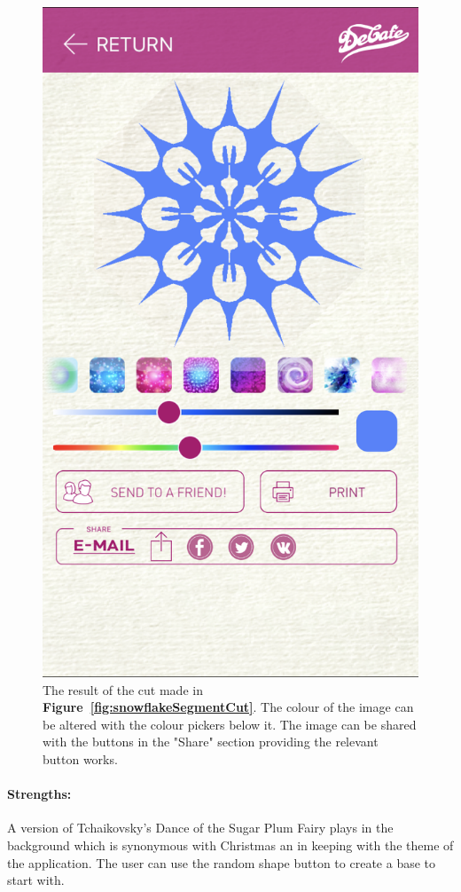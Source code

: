 \documentclass[11pt]{article}
\begin{document}
\begin{figure}[!ht]
\begin{minipage}{0.45\textwidth}
                            \label{fig:snowflakeSegmentCut}
                        \end{minipage}\hfill
                        \begin{minipage}{0.45\textwidth}
                            \centering
                            \includegraphics[width=0.7\linewidth]{Images/snowflakeResult}
                            \caption{The result of the cut made in \textbf{Figure~\ref{fig:snowflakeSegmentCut}}. The colour of the image can be altered with the colour pickers below it. The image can be shared with the buttons in the "Share" section providing the relevant button works.}
                            \label{fig:snowflakeResult}
                        \end{minipage}
                    \end{figure}
                    
                    
                    
                \paragraph{Strengths:}
                A version of Tchaikovsky's Dance of the Sugar Plum Fairy plays in the background which is synonymous with Christmas an in keeping with the theme of the application. 
                The user can use the random shape button to create a base to start with. 
                
\end{document}
